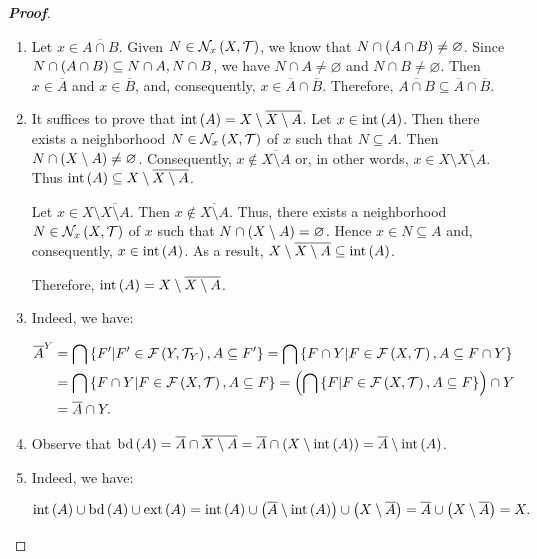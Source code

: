 \begin{proposition}
\begin{proof}[\rm\textbf{Proof}]
\begin{enumerate}
      Therefore, $\overline{A\cup B}=\overline{A}\cup\overline{B}$.
      \item Let $x\in\overline{A\cap B}$. Given $N\in\mathcal{N}_x\left(X,\mathcal{T}\right)$, we know that $N\cap\left(A\cap B\right)\neq\varnothing$. Since $N\cap\left(A\cap B\right)\subseteq N\cap A,N\cap B$, we have $N\cap A\neq\varnothing$ and $N\cap B\neq\varnothing$. Then $x\in\overline{A}$ and $x\in\overline{B}$, and, consequently, $x\in\overline{A}\cap\overline{B}$. Therefore, $\overline{A\cap B}\subseteq\overline{A}\cap\overline{B}$.
      \item It suffices to prove that $\operatorname{int}\left(A\right)=X\setminus\overline{X\setminus A}$. Let $x\in\operatorname{int}\left(A\right)$. Then there exists a neighborhood $N\in\mathcal{N}_x\left(X,\mathcal{T}\right)$ of $x$ such that $N\subseteq A$. Then $N\cap\left(X\setminus A\right)\neq\varnothing$. Consequently, $x\notin\overline{X\setminus A}$ or, in other words, $x\in X\setminus\overline{X\setminus A}$. Thus $\operatorname{int}\left(A\right)\subseteq X\setminus\overline{X\setminus A}$.
      
      Let $x\in X\setminus\overline{X\setminus A}$. Then $x\notin\overline{X\setminus A}$. Thus, there exists a neighborhood $N\in\mathcal{N}_x\left(X,\mathcal{T}\right)$ of $x$ such that $N\cap\left(X\setminus A\right)=\varnothing$. Hence $x\in N\subseteq A$ and, consequently, $x\in\operatorname{int}\left(A\right)$. As a result, $X\setminus\overline{X\setminus A}\subseteq\operatorname{int}\left(A\right)$.

      Therefore, $\operatorname{int}\left(A\right)=X\setminus\overline{X\setminus A}$.
      \item Indeed, we have:
      
      \begin{equation}
        \begin{split}
          \overline{A}^Y & =\bigcap\left\{F'\middle|F'\in\mathcal{F}\left(Y,\mathcal{T}_Y\right),A\subseteq F'\right\}=\bigcap\left\{F\cap Y\middle|F\in\mathcal{F}\left(X,\mathcal{T}\right),A\subseteq F\cap Y\right\}\\
          & =\bigcap\left\{F\cap Y\middle|F\in\mathcal{F}\left(X,\mathcal{T}\right),A\subseteq F\right\}=\left(\bigcap\left\{F\middle|F\in\mathcal{F}\left(X,\mathcal{T}\right),A\subseteq F\right\}\right)\cap Y\\
          & =\overline{A}\cap Y.
        \end{split}
      \end{equation}
      \item Observe that $\operatorname{bd}\left(A\right)=\overline{A}\cap\overline{X\setminus A}=\overline{A}\cap\left(X\setminus\text{int}\left(A\right)\right)=\overline{A}\setminus\operatorname{int}\left(A\right)$.
      \item Indeed, we have:
      
      \begin{equation}
        \operatorname{int}\left(A\right)\cup\operatorname{bd}\left(A\right)\cup\operatorname{ext}\left(A\right)=\operatorname{int}\left(A\right)\cup\left(\overline{A}\setminus\operatorname{int}\left(A\right)\right)\cup\left(X\setminus\overline{A}\right)=\overline{A}\cup\left(X\setminus\overline{A}\right)=X.
      \end{equation}
    \end{enumerate}
  \end{proof}
\end{proposition}

